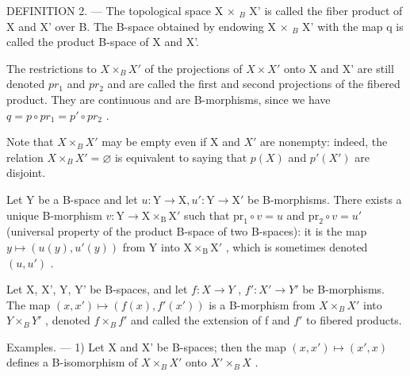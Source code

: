 DEFINITION 2. --- The topological space X × \(_{B}\) X' is called the fiber product of X and X' over B. The B-space obtained by endowing X × \(_{B}\) X' with the map q is called the product B-space of X and X'.

The restrictions to \(X \times_{B} X'\) of the projections of \(X \times X'\) onto X and X' are still denoted \(pr_{1}\) and \(pr_{2}\) and are called the first and second projections of the fibered product. They are continuous and are B-morphisms, since we have \(q = p \circ pr_{1} = p' \circ pr_{2}\) .

Note that \(X \times_{B} X'\) may be empty even if X and \(X'\) are nonempty: indeed, the relation \(X \times_{B} X' = \varnothing\) is equivalent to saying that \(p(X)\) and \(p'(X')\) are disjoint.

Let Y be a B-space and let \(u\colon\mathrm{Y}\to\mathrm{X}, u'\colon\mathrm{Y}\to\mathrm{X}'\) be B-morphisms. There exists a unique B-morphism \(v\colon\mathrm{Y}\to\mathrm{X}\times_{\mathrm{B}}\mathrm{X}'\) such that \(\mathrm{pr}_{1}\circ v=u\) and \(\mathrm{pr}_{2}\circ v=u'\) (universal property of the product B-space of two B-spaces): it is the map \(y\mapsto(u(y),u'(y))\) from Y into \(\mathrm{X}\times_{\mathrm{B}}\mathrm{X}'\) , which is sometimes denoted \((u,u')\) .

Let X, X', Y, Y' be B-spaces, and let \(f: X \to Y\) , \(f': X' \to Y'\) be B-morphisms. The map \((x, x') \mapsto (f(x), f'(x'))\) is a B-morphism from \(X \times_{B} X'\) into \(Y \times_{B} Y'\) , denoted \(f \times_{B} f'\) and called the extension of f and \(f'\) to fibered products.

Examples. --- 1) Let X and X' be B-spaces; then the map \((x, x') \mapsto (x', x)\) defines a B-isomorphism of \(X \times_{B} X'\) onto \(X' \times_{B} X\) .

